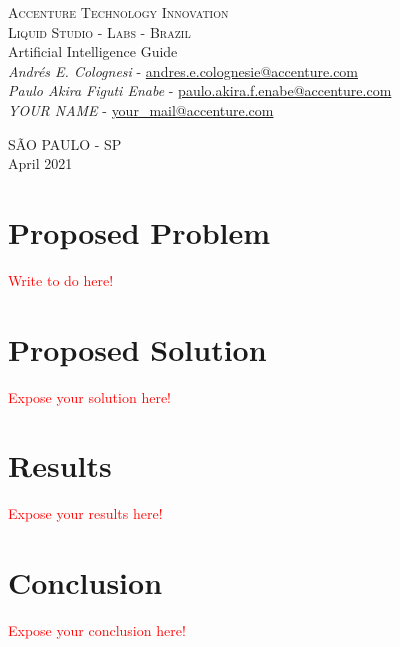 \documentclass[12pt]{article}
\begin{document}
\begin{titlepage}
\begin{center}
\textsc{ \Large Accenture Technology Innovation}\\ [1.0cm]
\textsc{ \large Liquid Studio - Labs - Brazil}\\[5.5cm]
{ \huge Artificial Intelligence Guide} \\[2.0cm]
\emph{Andrés E. Colognesi} - \href{mailto:andres.e.colognesi@accenture.com}{andres.e.colognesie@accenture.com} \\
\emph{Paulo Akira Figuti Enabe} - \href{mailto:paulo.akira.f.enabe@accenture.com}{paulo.akira.f.enabe@accenture.com}
\\[1.0cm]
\emph{YOUR NAME} - \href{mailto:your\_mail@accenture.com}{your\_mail@accenture.com}

\vfill{
\large \uppercase{São Paulo - SP}\\[0.5cm]
April 2021
}

\end{center}
\end{titlepage}

\newpage

\tableofcontents

\newpage

\section{Proposed Problem}

\textcolor{red}{Write to do here!}

\bigbreak


\section{Proposed Solution}

\textcolor{red}{Expose your solution here!}

\bigbreak


\section{Results}

\textcolor{red}{Expose your results here!}

\bigbreak


\section{Conclusion}

\textcolor{red}{Expose your conclusion here!}

\newpage





\end{document}

